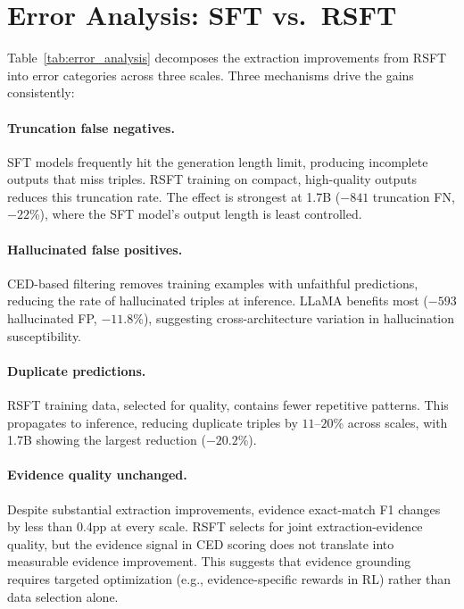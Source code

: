 \section{Error Analysis: SFT vs.\ RSFT}
\label{sec:error_analysis}

Table~\ref{tab:error_analysis} decomposes the extraction improvements from RSFT into error categories across three scales. Three mechanisms drive the gains consistently:

\paragraph{Truncation false negatives.} SFT models frequently hit the generation length limit, producing incomplete outputs that miss triples. RSFT training on compact, high-quality outputs reduces this truncation rate. The effect is strongest at 1.7B ($-841$ truncation FN, $-22$\%), where the SFT model's output length is least controlled.

\paragraph{Hallucinated false positives.} CED-based filtering removes training examples with unfaithful predictions, reducing the rate of hallucinated triples at inference. LLaMA benefits most ($-593$ hallucinated FP, $-11.8$\%), suggesting cross-architecture variation in hallucination susceptibility.

\paragraph{Duplicate predictions.} RSFT training data, selected for quality, contains fewer repetitive patterns. This propagates to inference, reducing duplicate triples by $11$--$20$\% across scales, with 1.7B showing the largest reduction ($-20.2$\%).

\paragraph{Evidence quality unchanged.} Despite substantial extraction improvements, evidence exact-match F1 changes by less than 0.4pp at every scale. RSFT selects for joint extraction-evidence quality, but the evidence signal in CED scoring does not translate into measurable evidence improvement. This suggests that evidence grounding requires targeted optimization (e.g., evidence-specific rewards in RL) rather than data selection alone.


